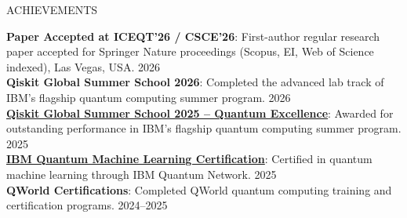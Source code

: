 \documentclass{resume} %
\begin{document}






\begin{rSection}{ACHIEVEMENTS} \itemsep -3pt

{\textbf{Paper Accepted at ICEQT'26 / CSCE'26}}: First-author regular research paper accepted for Springer Nature proceedings (Scopus, EI, Web of Science indexed), Las Vegas, USA. \hfill 2026\vspace{.1cm} \\
{\textbf{Qiskit Global Summer School 2026}}: Completed the advanced lab track of IBM's flagship quantum computing summer program. \hfill 2026\vspace{.1cm} \\
{\textbf{\href{https://www.credly.com/badges/a75dd94e-7940-4d55-a712-8240119af167/public_url}{Qiskit Global Summer School 2025 – Quantum Excellence}}}: Awarded for outstanding performance in IBM's flagship quantum computing summer program. \hfill 2025\vspace{.1cm} \\
{\textbf{\href{https://www.credly.com/badges/94c6fdc0-a253-482e-9f7b-c4f0c8b45dbe/public_url}{IBM Quantum Machine Learning Certification}}}: Certified in quantum machine learning through IBM Quantum Network. \hfill 2025\vspace{.1cm} \\
{\textbf{QWorld Certifications}}: Completed QWorld quantum computing training and certification programs. \hfill 2024–2025

\end{rSection}
\end{document}

